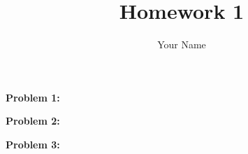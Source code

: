 \documentclass[11pt]{article}
\title{Homework 1}
\author{Your Name}
\begin{document}
\maketitle

\textbf{Problem 1:}


\clearpage


\textbf{Problem 2:}


\clearpage

\textbf{Problem 3:}


\clearpage
\end{document}
